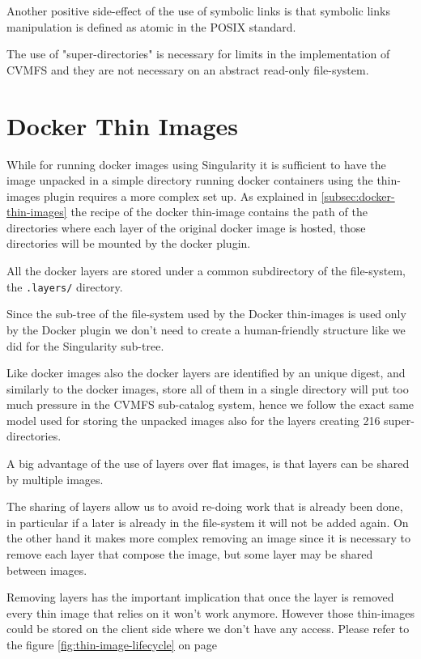 Another positive side-effect of the use of symbolic links is that symbolic
links manipulation is defined as atomic in the POSIX standard.

The use of "super-directories" is necessary for limits in the implementation of
CVMFS and they are not necessary on an abstract read-only file-system.

\section{Docker Thin Images}
\label{sec:methodology-docker}

While for running docker images using Singularity it is sufficient to have the
image unpacked in a simple directory running docker containers using the
thin-images plugin requires a more complex set up.  As explained in
\ref{subsec:docker-thin-images} the recipe of the docker thin-image contains
the path of the directories where each layer of the original docker image is
hosted, those directories will be mounted by the docker plugin.

All the docker layers are stored under a common subdirectory of the
file-system, the \texttt{.layers/} directory.

Since the sub-tree of the file-system used by the Docker thin-images is used only
by the Docker plugin we don't need to create a human-friendly structure like we
did for the Singularity sub-tree.

Like docker images also the docker layers are identified by an unique digest,
and similarly to the docker images, store all of them in a single directory
will put too much pressure in the CVMFS sub-catalog system, hence we follow the
exact same model used for storing the unpacked images also for the layers
creating 216 super-directories.

A big advantage of the use of layers over flat images, is that layers can be
shared by multiple images.

The sharing of layers allow us to avoid re-doing work that is already been
done, in particular if a later is already in the file-system it will not be
added again. On the other hand it makes more complex removing an image since it
is necessary to remove each layer that compose the image, but some layer may be
shared between images.

Removing layers has the important implication that once the layer is removed
every thin image that relies on it won’t work anymore.  However those
thin-images could be stored on the client side where we don’t have any access.
Please refer to the figure \ref{fig:thin-image-lifecycle} on page
\pageref{fig:thin-image-lifecycle}

